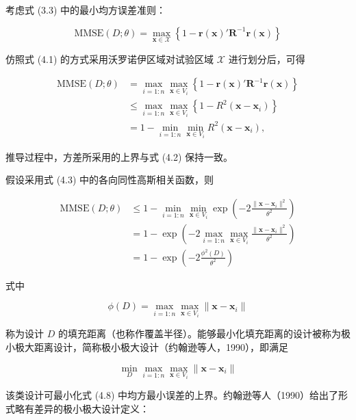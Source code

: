 \documentclass{ctexart}
\begin{document}
考虑式 (3.3) 中的最小均方误差准则：

\begin{equation*}
\mathrm{MMSE}(D;\theta)=\max_{\boldsymbol{x}\in\mathcal{X}}\left\{1-\boldsymbol{r}(\boldsymbol{x})'\boldsymbol{R}^{-1}\boldsymbol{r}(\boldsymbol{x})\right\}
\end{equation*}

仿照式 (4.1) 的方式采用沃罗诺伊区域对试验区域 $\mathcal{X}$ 进行划分后，可得

\begin{align*}
\mathrm{MMSE}(D;\theta)
&=\max_{i=1:n}\max_{\boldsymbol{x}\in V_i}\left\{1-\boldsymbol{r}(\boldsymbol{x})'\boldsymbol{R}^{-1}\boldsymbol{r}(\boldsymbol{x})\right\}\\
&\le\max_{i=1:n}\max_{\boldsymbol{x}\in V_i}\left\{1-R^2(\boldsymbol{x}-\boldsymbol{x}_i)\right\}\\
&=1-\min_{i=1:n}\min_{\boldsymbol{x}\in V_i}R^2(\boldsymbol{x}-\boldsymbol{x}_i),
\end{align*}

推导过程中，方差所采用的上界与式 (4.2) 保持一致。

假设采用式 (4.3) 中的各向同性高斯相关函数，则

\begin{align*}
\mathrm{MMSE}(D;\theta)
&\leq1-\min_{i=1:n}\min_{\boldsymbol{x}\in V_i}\exp\left(-2\frac{\|\boldsymbol{x}-\boldsymbol{x}_i\|^2}{\theta^2}\right)\\
&=1-\exp\left(-2\max_{i=1:n}\max_{\boldsymbol{x}\in V_i}\frac{\|\boldsymbol{x}-\boldsymbol{x}_i\|^2}{\theta^2}\right)\\
&=1-\exp\left(-2\frac{\phi^2(D)}{\theta^2}\right)
\tag{4.8}
\end{align*}

式中

\begin{equation*}
\phi(D)=\max_{i=1:n}\max_{\boldsymbol{x}\in V_i}\|\boldsymbol{x}-\boldsymbol{x}_i\|
\end{equation*}

称为设计 $D$ 的填充距离（也称作覆盖半径）。能够最小化填充距离的设计被称为极小极大距离设计，简称极小极大设计（约翰逊等人，1990），即满足

\begin{equation*}
\min_D\max_{i=1:n}\max_{\boldsymbol{x}\in V_i}\|\boldsymbol{x}-\boldsymbol{x}_i\|
\tag{4.9}
\end{equation*}

该类设计可最小化式 (4.8) 中均方最小误差的上界。约翰逊等人（1990）给出了形式略有差异的极小极大设计定义：
\end{document}
